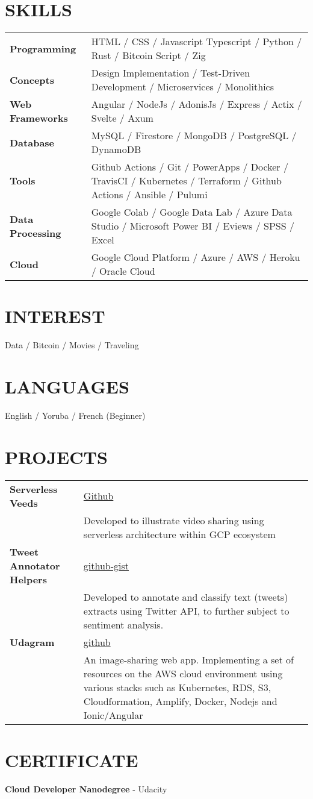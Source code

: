 \documentclass[a4paper,12pt]{article}
\begin{document}
\section{SKILLS}

\begin{tabularx}{\linewidth}{@{}l X@{}}
\textbf{Programming} & HTML / CSS / Javascript Typescript / Python / Rust / Bitcoin Script / Zig \\
\textbf{Concepts} & Design Implementation / Test-Driven Development / Microservices / Monolithics \\
\textbf{Web Frameworks} & Angular / NodeJs / AdonisJs / Express / Actix / Svelte / Axum \\
\textbf{Database} & MySQL / Firestore / MongoDB / PostgreSQL / DynamoDB \\
\textbf{Tools} & Github Actions / Git / PowerApps / Docker / TravisCI / Kubernetes / Terraform / Github Actions / Ansible / Pulumi  \\
\textbf{Data Processing} & Google Colab / Google Data Lab / Azure Data Studio / Microsoft Power BI / Eviews / SPSS / Excel \\
\textbf{Cloud} & Google Cloud Platform / Azure / AWS / Heroku / Oracle Cloud
\end{tabularx}

\section{INTEREST}
Data / Bitcoin / Movies / Traveling

\section{LANGUAGES}
English / Yoruba / French (Beginner)

\section{PROJECTS}

\begin{tabularx}{\linewidth}{@{}l X@{}}
\textbf{Serverless Veeds} & \hfill \href{https://github.com/nully0x/serverless-veeds}{Github} \\
& Developed to illustrate video sharing using serverless architecture within GCP ecosystem\\[10pt]
\textbf{Tweet Annotator Helpers} & \hfill \href{https://github-gist.com}{github-gist} \\
& Developed to annotate and classify text (tweets) extracts using Twitter API, to further subject to sentiment analysis. \\[10pt]
\textbf{Udagram} & \hfill \href{https://github.com}{github} \\
& An image-sharing web app. Implementing a set of resources on the AWS cloud environment using various stacks such as Kubernetes, RDS, S3, Cloudformation, Amplify, Docker, Nodejs and Ionic/Angular
\end{tabularx}

\section{CERTIFICATE}
\textbf{Cloud Developer Nanodegree} - Udacity

\vfill
{}
\end{document}
